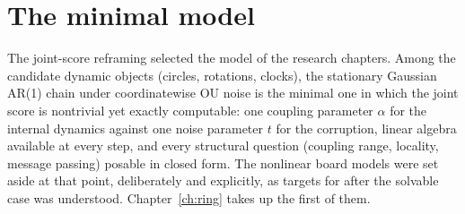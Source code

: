 \section{The minimal model}\label{sec:dev-minimal}

The joint-score reframing selected the model of the research chapters.
Among the candidate dynamic objects (circles, rotations, clocks), the
stationary Gaussian AR(1) chain under coordinatewise OU noise is the
minimal one in which the joint score is nontrivial yet exactly
computable: one coupling parameter $\alpha$ for the internal dynamics
against one noise parameter $t$ for the corruption, linear algebra
available at every step, and every structural question (coupling range,
locality, message passing) posable in closed form. The nonlinear board
models were set aside at that point, deliberately and explicitly, as targets
for after the solvable case was understood. Chapter~\ref{ch:ring} takes up the
first of them.

